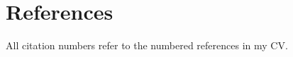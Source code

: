 \documentclass[12pt]{article}
\begin{document}
%
%

\section*{References}

All citation numbers refer to the numbered references in my CV.
\end{document}
